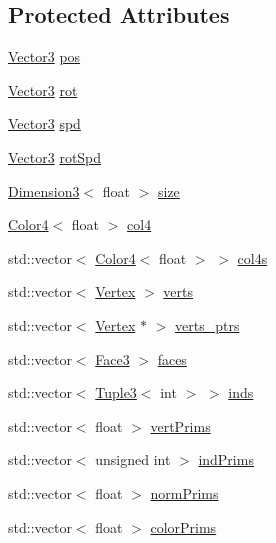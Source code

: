 \subsection*{Protected Attributes}
\begin{DoxyCompactItemize}
\item 
\hyperlink{class_vector3}{Vector3} \hyperlink{class_geom_base_ace2fc0557767dbb702aaf1655a85ed92}{pos}
\item 
\hyperlink{class_vector3}{Vector3} \hyperlink{class_geom_base_a7de363bab1e976c73e495cf973a51de7}{rot}
\item 
\hyperlink{class_vector3}{Vector3} \hyperlink{class_geom_base_a00d3b4512a14c19c818caf93681d36df}{spd}
\item 
\hyperlink{class_vector3}{Vector3} \hyperlink{class_geom_base_a4be21b8e87e34a60ad9a2a38aae69ea1}{rot\-Spd}
\item 
\hyperlink{class_dimension3}{Dimension3}$<$ float $>$ \hyperlink{class_geom_base_a3361cbbc26a1ef9768b1f0216af70bd1}{size}
\item 
\hyperlink{class_color4}{Color4}$<$ float $>$ \hyperlink{class_geom_base_acd58b67fcdac4428f66bea2c58c3aad8}{col4}
\item 
std\-::vector$<$ \hyperlink{class_color4}{Color4}$<$ float $>$ $>$ \hyperlink{class_geom_base_a0a55c12de2788567600e4477017df3fb}{col4s}
\item 
std\-::vector$<$ \hyperlink{class_vertex}{Vertex} $>$ \hyperlink{class_geom_base_ad9a00c1c60c9283b3a5995e8cfc6afb5}{verts}
\item 
std\-::vector$<$ \hyperlink{class_vertex}{Vertex} $\ast$ $>$ \hyperlink{class_geom_base_a345dad26b0f2e40b097546774baed95d}{verts\-\_\-ptrs}
\item 
std\-::vector$<$ \hyperlink{class_face3}{Face3} $>$ \hyperlink{class_geom_base_ac267e0a8d536d8f46d21c886cd809fdb}{faces}
\item 
std\-::vector$<$ \hyperlink{class_tuple3}{Tuple3}$<$ int $>$ $>$ \hyperlink{class_geom_base_ab6559c65d93ef3e006b66a951fa40300}{inds}
\item 
std\-::vector$<$ float $>$ \hyperlink{class_geom_base_abb278debe87d4c0882d946d520e24715}{vert\-Prims}
\item 
std\-::vector$<$ unsigned int $>$ \hyperlink{class_geom_base_a99010b39b4d43e01a899f9c88f64cb28}{ind\-Prims}
\item 
std\-::vector$<$ float $>$ \hyperlink{class_geom_base_ab225e16399ab6264821b49160f0fe437}{norm\-Prims}
\item 
std\-::vector$<$ float $>$ \hyperlink{class_geom_base_a9cbaa9c2f3d392874bdf96dbdf426852}{color\-Prims}

\end{DoxyCompactItemize}
